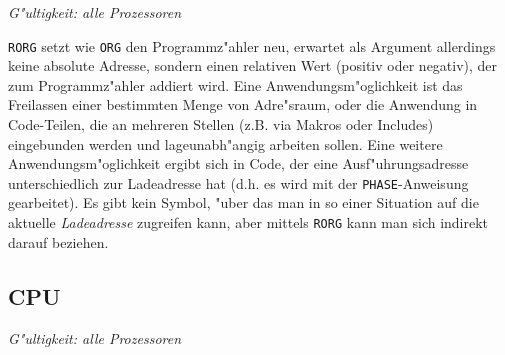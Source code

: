 \documentclass[12pt,a4paper,twoside]{report}
\makeatletter
\newcommand{\tty}[1]{{\tt #1}}
\newcommand{\ttindex}[1]{\index{#1@{\tt #1}}}
\makeatother
\begin{document}
{\em G"ultigkeit: alle Prozessoren}

\tty{RORG} setzt wie \tty{ORG} den Programmz"ahler neu, erwartet
als Argument allerdings keine absolute Adresse, sondern einen
relativen Wert (positiv oder negativ), der zum Programmz"ahler
addiert wird.  Eine Anwendungsm"oglichkeit ist das Freilassen
einer bestimmten Menge von Adre"sraum, oder die Anwendung in
Code-Teilen, die an mehreren Stellen (z.B. via Makros oder
Includes) eingebunden werden und lageunabh"angig arbeiten sollen.
Eine weitere Anwendungsm"oglichkeit ergibt sich in Code, der eine
Ausf"uhrungsadresse unterschiedlich zur Ladeadresse hat (d.h. es
wird mit der \tty{PHASE}-Anweisung gearbeitet).  Es gibt kein
Symbol, "uber das man in so einer Situation auf die aktuelle
{\em Ladeadresse} zugreifen kann, aber mittels \tty{RORG} kann man
sich indirekt darauf beziehen.


\subsection{CPU}
\label{SectCPU}
\ttindex{CPU}

{\em G"ultigkeit: alle Prozessoren}
\end{document}
